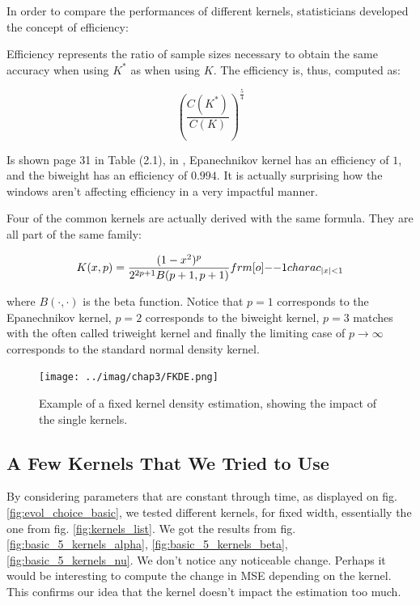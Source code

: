 \documentclass[11pt]{book}
\begin{document}
In order to compare the performances of different kernels, statisticians developed the concept of efficiency:

\begin{definition}
Efficiency represents the ratio of sample sizes necessary
to obtain the same accuracy when using $K^*$ as when using $K$. The efficiency is, thus, computed as:

$$ \left ( \frac{C(K^*)}{C(K)} \right ) ^{\frac 5 4 } $$
\end{definition}

Is shown page 31 in Table (2.1), in \cite{Wand}, Epanechnikov kernel has an efficiency of $1$, and the biweight has an efficiency of $0.994$. It is actually surprising how the windows aren't affecting efficiency in a very impactful manner.



\begin{remarque}
Four of the common kernels are actually derived with the same formula. They are all part of the same family:

$$ K(x,p) = \frac{(1-x^2)^p}{2^{2p+1} B(p+1,p+1) } \11charac_{\abs x < 1 }$$

where $B(\cdot, \cdot)$ is the beta function. Notice that $p=1$ corresponds to the Epanechnikov kernel, $p=2$ corresponds to the biweight kernel, $p=3$ matches with the often called triweight kernel and finally the limiting case of $p \to \infty$ corresponds to the standard normal density kernel. 
\end{remarque}


\begin{figure}
\centering
\texttt{[image: ../imag/chap3/FKDE.png]}
\caption{Example of a fixed kernel density estimation, showing the impact of the single kernels.}
\label{fig:FKDE}
\end{figure}

\subsection{A Few Kernels That We Tried to Use}

By considering parameters that are constant through time, as displayed on fig. \ref{fig:evol_choice_basic}, we tested different kernels, for fixed width, essentially the one from fig. \ref{fig:kernels_list}. We got the results from fig. \ref{fig:basic_5_kernels_alpha}, \ref{fig:basic_5_kernels_beta}, \ref{fig:basic_5_kernels_nu}. We don't notice any noticeable change. Perhaps it would be interesting to compute the change in MSE depending on the kernel. This confirms our idea that the kernel doesn't impact the estimation too much.
\end{document}
